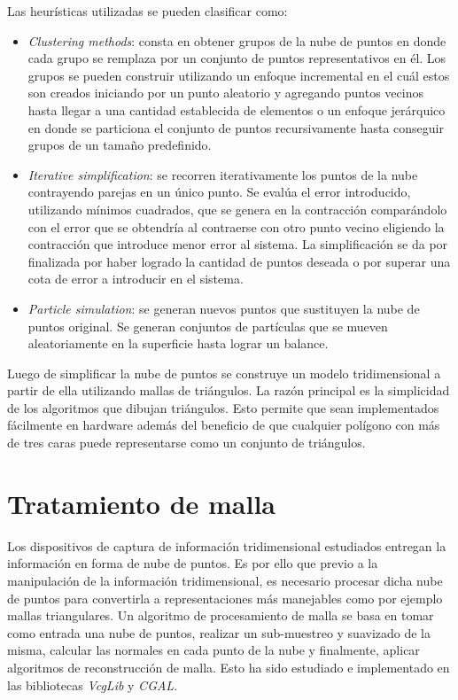 Las heurísticas utilizadas se pueden clasificar como\cite{PntCloud}:
\begin{itemize}
   \item \emph{Clustering methods}: consta en obtener grupos de la nube de puntos en donde cada grupo se remplaza por un conjunto de puntos representativos en él. Los grupos se pueden construir utilizando un enfoque incremental en el cuál estos son creados iniciando por un punto aleatorio y agregando puntos vecinos hasta llegar a una cantidad establecida de elementos o un enfoque jerárquico en donde se particiona el conjunto de puntos recursivamente hasta conseguir grupos de un tamaño predefinido.
   \item \emph{Iterative simplification}: se recorren iterativamente los puntos de la nube contrayendo parejas en un único punto. Se evalúa el error introducido, utilizando mínimos cuadrados, que se genera en la contracción comparándolo con el error que se obtendría al contraerse con otro punto vecino eligiendo la contracción que introduce menor error al sistema. La simplificación se da por finalizada por haber logrado la cantidad de puntos deseada o por superar una cota de error a introducir en el sistema.
   \item \emph{Particle simulation}: se generan nuevos puntos que sustituyen la nube de puntos original. Se generan conjuntos de partículas que se mueven aleatoriamente en la superficie hasta lograr un balance. %
\end{itemize}

Luego de simplificar la nube de puntos se construye un modelo tridimensional a partir de ella utilizando mallas de triángulos. La razón principal es la simplicidad de los algoritmos que dibujan triángulos. Esto permite que sean implementados fácilmente en hardware además del beneficio de que cualquier polígono con más de tres caras puede representarse como un conjunto de triángulos\cite{PCloudTriangle}.

\section{Tratamiento de malla}

Los dispositivos de captura de información tridimensional estudiados entregan la información en forma de nube de puntos. Es por ello que previo a la manipulación de la información tridimensional, es necesario procesar dicha nube de puntos para convertirla a representaciones más manejables como por ejemplo mallas triangulares.
Un algoritmo de procesamiento de malla se basa en tomar como entrada una nube de puntos, realizar un sub-muestreo y suavizado de la misma, calcular las normales en cada punto de la nube y finalmente, aplicar algoritmos de reconstrucción de malla. Esto ha sido estudiado e implementado en las bibliotecas \emph{VcgLib}\cite{VCGLib} y \emph{CGAL}\cite{CGAL}.

